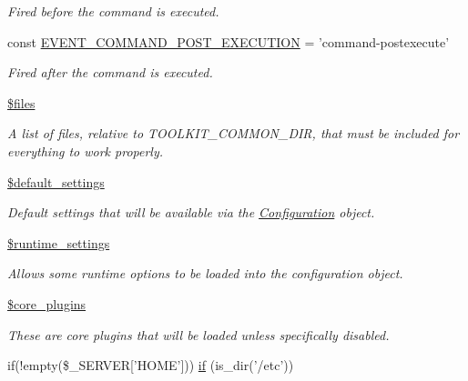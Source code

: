 \begin{DoxyCompactItemize}
\begin{DoxyCompactList}\small\item\em Fired before the command is executed. \end{DoxyCompactList}\item 
const \hyperlink{group__events_ga3e0b4f668de297a00c286c8d490cbe28}{E\-V\-E\-N\-T\-\_\-\-C\-O\-M\-M\-A\-N\-D\-\_\-\-P\-O\-S\-T\-\_\-\-E\-X\-E\-C\-U\-T\-I\-O\-N} = 'command-\/postexecute'
\begin{DoxyCompactList}\small\item\em Fired after the command is executed. \end{DoxyCompactList}\item 
\hyperlink{common_8inc_a9590b15215a21e9b42eb546aeef79704}{\$files}
\begin{DoxyCompactList}\small\item\em A list of files, relative to T\-O\-O\-L\-K\-I\-T\-\_\-\-C\-O\-M\-M\-O\-N\-\_\-\-D\-I\-R, that must be included for everything to work properly. \end{DoxyCompactList}\item 
\hyperlink{common_8inc_a71d9864ceaa1b925fde0c8ea0f77abc3}{\$default\-\_\-settings}
\begin{DoxyCompactList}\small\item\em Default settings that will be available via the \hyperlink{classConfiguration}{Configuration} object. \end{DoxyCompactList}\item 
\hyperlink{common_8inc_ab9492937f7a4246d6d6c94cc9688d7e2}{\$runtime\-\_\-settings}
\begin{DoxyCompactList}\small\item\em Allows some runtime options to be loaded into the configuration object. \end{DoxyCompactList}\item 
\hyperlink{common_8inc_a9efe6b2fd5e0e018e9883090f254b25c}{\$core\-\_\-plugins}
\begin{DoxyCompactList}\small\item\em These are core plugins that will be loaded unless specifically disabled. \end{DoxyCompactList}\item 
if(!empty(\$\-\_\-\-S\-E\-R\-V\-E\-R\mbox{[}'H\-O\-M\-E'\mbox{]})) \hyperlink{common_8inc_ab5cc02e0dea17e26d5401b25d28c71a5}{if} (is\-\_\-dir('/etc'))
\end{DoxyCompactItemize}


